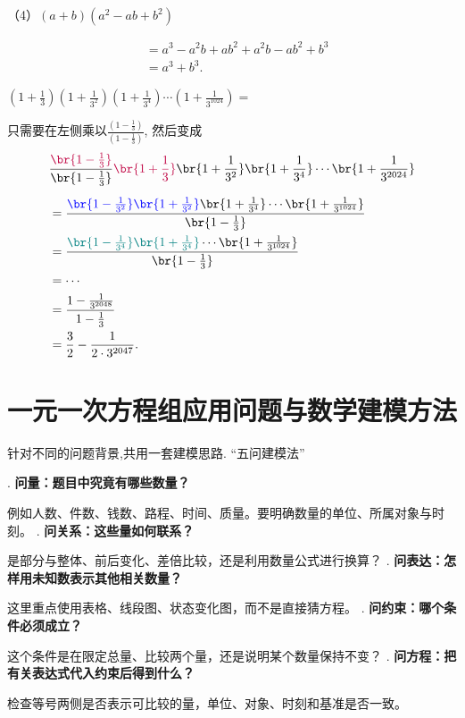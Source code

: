 \documentclass[lang=cn,12pt,fontset=none,a4paper]{beautybook}
\begin{document}
（4）$(a+b)\left(a^2-a b+b^2\right)$

$$
\begin{aligned}
& =a^3-a^2 b+a b^2+a^2 b-a b^2+b^3 \\
& =a^3+b^3 .
\end{aligned}
$$

\newpage
\begin{problem}
   $(1+\frac 13)(1+\frac{1}{3^2})(1+\frac{1}{3^4})\cdots (1+\frac{1}{3^{1024}})=$
\end{problem}
   
\begin{solution}
   只需要在左侧乘以$\frac{(1-\frac{1}{3})}{(1-\frac{1}{3})}$, 然后变成
   \[
   \begin{aligned}
      &\frac{{\color{purple}\br{1-\frac{1}{3}}}}{\br{1-\frac{1}{3}}} {\color{purple}\br{1+\frac{1}{3}}}\br{1+\frac{1}{3^2}}\br{1+\frac{1}{3^4}}\cdots \br{1+\frac{1}{3^{2024}}} \\[.5em]
      &=\frac{
{\color{blue}\br{1-\frac{1}{3^2}}\br{1+\frac{1}{3^2}}}\br{1+\frac{1}{3^4}}\cdots \br{1+\frac{1}{3^{1024}}}
      }{\br{1-\frac{1}{3}}}\\ 
      &=\frac{
{\color{teal}\br{1-\frac{1}{3^4}}\br{1+\frac{1}{3^4}}}\cdots \br{1+\frac{1}{3^{1024}}}
      }{\br{1-\frac{1}{3}}}\\ 
      &=\cdots \\ 
      &=\frac{1-\frac{1}{3^{2048}}}{1-\frac{1}{3}}\\ 
      &=\frac{3}{2}-\frac{1}{2\cdot 3^{2047}}.
   \end{aligned}
   \]
\end{solution}

\section{一元一次方程组应用问题与数学建模方法}


\begin{proposition}
   针对不同的问题背景,共用一套建模思路. ``五问建模法''
   \begin{myitemize}
      . \textbf{问量：题目中究竟有哪些数量？}
   
   例如人数、件数、钱数、路程、时间、质量。要明确数量的单位、所属对象与时刻。
      . \textbf{问关系：这些量如何联系？}
   
   是部分与整体、前后变化、差倍比较，还是利用数量公式进行换算？
      . \textbf{问表达：怎样用未知数表示其他相关数量？}
   
   这里重点使用表格、线段图、状态变化图，而不是直接猜方程。
      . \textbf{问约束：哪个条件必须成立？}
   
   这个条件是在限定总量、比较两个量，还是说明某个数量保持不变？
      . \textbf{问方程：把有关表达式代入约束后得到什么？}
   
   检查等号两侧是否表示可比较的量，单位、对象、时刻和基准是否一致。
   \end{myitemize}
\end{proposition}
   
\end{document}
